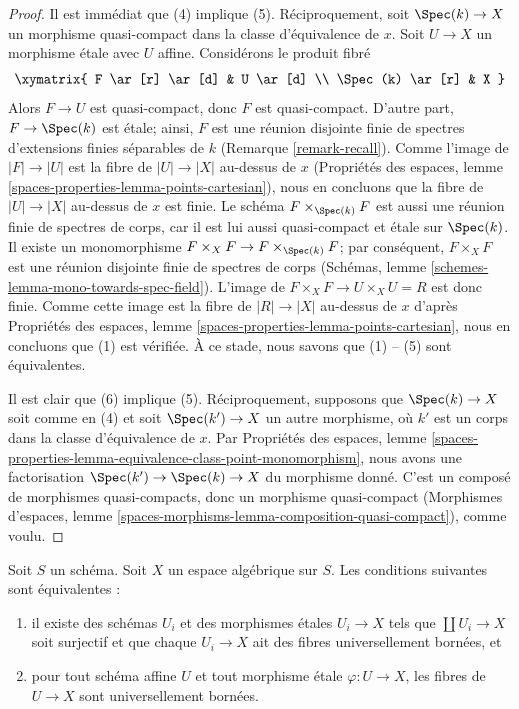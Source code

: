 \begin{proof}
\medskip\noindent
Il est immédiat que (4) implique (5). Réciproquement, soit
$\Spec(k) \to X$ un morphisme quasi-compact dans la classe d'équivalence de
$x$. Soit $U \to X$ un morphisme étale avec $U$ affine. Considérons le
produit fibré
$$
\xymatrix{
F \ar[r] \ar[d] & U \ar[d] \\
\Spec(k) \ar[r] & X
}
$$
Alors $F \to U$ est quasi-compact, donc $F$ est quasi-compact.
D'autre part, $F \to \Spec(k)$ est étale; ainsi, $F$ est une
réunion disjointe finie de spectres d'extensions finies séparables de $k$
(Remarque \ref{remark-recall}). Comme l'image de $|F| \to |U|$
est la fibre de $|U| \to |X|$ au-dessus de $x$ (Propriétés des espaces, lemme
\ref{spaces-properties-lemma-points-cartesian}), nous en concluons que
la fibre de $|U| \to |X|$ au-dessus de $x$ est finie. Le schéma
$F \times_{\Spec(k)} F$ est aussi une réunion finie de spectres de corps,
car il est lui aussi quasi-compact et étale sur $\Spec(k)$.
Il existe un monomorphisme
$F \times_X F \to F \times_{\Spec(k)} F$; par conséquent, $F \times_X F$ est
une réunion disjointe finie de spectres de corps
(Schémas, lemme \ref{schemes-lemma-mono-towards-spec-field}).
L'image de $F \times_X F \to U \times_X U = R$ est donc finie.
Comme cette image est la fibre de $|R| \to |X|$ au-dessus de $x$ d'après
Propriétés des espaces, lemme \ref{spaces-properties-lemma-points-cartesian},
nous en concluons que (1) est vérifiée. À ce stade, nous savons que
(1) -- (5) sont équivalentes.

\medskip\noindent
Il est clair que (6) implique (5). Réciproquement, supposons que
$\Spec(k) \to X$ soit comme en (4) et soit $\Spec(k') \to X$ un autre
morphisme, où $k'$ est un corps dans la classe d'équivalence de $x$. Par
Propriétés des espaces, lemme
\ref{spaces-properties-lemma-equivalence-class-point-monomorphism},
nous avons une factorisation $\Spec(k') \to \Spec(k) \to X$ du morphisme
donné. C'est un composé de morphismes quasi-compacts, donc un morphisme
quasi-compact (Morphismes d'espaces,
lemme \ref{spaces-morphisms-lemma-composition-quasi-compact}), comme voulu.
\end{proof}

\begin{lemma}
\label{lemma-U-universally-bounded}
Soit $S$ un schéma. Soit $X$ un espace algébrique sur $S$.
Les conditions suivantes sont équivalentes :
\begin{enumerate}
\item il existe des schémas $U_i$ et des morphismes étales
$U_i \to X$ tels que $\coprod U_i \to X$ soit surjectif et que
chaque $U_i \to X$ ait des fibres universellement bornées, et
\item pour tout schéma affine $U$ et tout morphisme étale $\varphi : U \to X$,
les fibres de $U \to X$ sont universellement bornées.
\end{enumerate}
\end{lemma}

